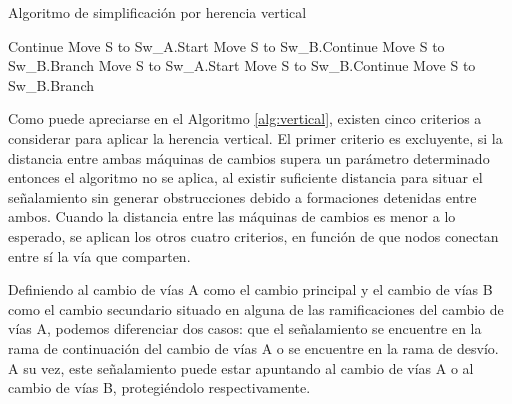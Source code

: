 	\begin{algorithm}[hbt!]
        \caption{Algoritmo de simplificación por herencia vertical}\label{alg:vertical}
        \DontPrintSemicolon
        \SetNoFillComment
        \LinesNotNumbered 
        {
            {
                {
                    Continue\;
                }
                {
                   {
                        Move S to Sw\_A.Start\;
                   }
                   {
                        Move S to Sw\_B.Continue\;
                        Move S to Sw\_B.Branch\;
                   }
                }
                {
                   {
                        Move S to Sw\_A.Start\;
                   }
                   {
                        Move S to Sw\_B.Continue\;
                        Move S to Sw\_B.Branch\;
                   }
                }
            }
        
        }
        \KwResult{[Signals]} 
    \end{algorithm}

    Como puede apreciarse en el Algoritmo \ref{alg:vertical}, existen cinco criterios a considerar para aplicar la herencia vertical. El primer criterio es excluyente, si la distancia entre ambas máquinas de cambios supera un parámetro determinado entonces el algoritmo no se aplica, al existir suficiente distancia para situar el señalamiento sin generar obstrucciones debido a formaciones detenidas entre ambos. Cuando la distancia entre las máquinas de cambios es menor a lo esperado, se aplican los otros cuatro criterios, en función de que nodos conectan entre sí la vía que comparten.
    
    Definiendo al cambio de vías A como el cambio principal y el cambio de vías B como el cambio secundario situado en alguna de las ramificaciones del cambio de vías A, podemos diferenciar dos casos: que el señalamiento se encuentre en la rama de continuación del cambio de vías A o se encuentre en la rama de desvío. A su vez, este señalamiento puede estar apuntando al cambio de vías A o al cambio de vías B, protegiéndolo respectivamente. 
    
